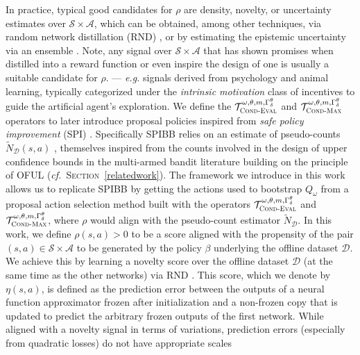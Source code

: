 In practice, typical good candidates for $\rho$ are density, novelty, or uncertainty estimates over
$\mathcal{S} \times \mathcal{A}$, which can be obtained, among other techniques,
via random network distillation (RND) \cite{Burda2018-vl},
or by estimating the epistemic uncertainty via an ensemble \cite{Osband2016-ff}.
Note, any signal over $\mathcal{S} \times \mathcal{A}$ that has shown promises when distilled into a reward function
or even inspire the design of one is usually a suitable candidate for $\rho$.
--- \textit{e.g.} signals derived from
psychology and animal learning,
typically categorized under the \textit{intrinsic motivation} \cite{Barto2013-jl, Niekum2010-yk, Schmidhuber2010-bg}
class of incentives to guide the artificial agent's exploration.
We define the
$\mathcal{T}_\textsc{Cond-Eval}^{\omega, \theta, m, \Gamma^\theta_\delta}$ and
$\mathcal{T}_\textsc{Cond-Max}^{\omega, \theta, m, \Gamma^\theta_\delta}$
operators to later introduce proposal policies inspired from \textit{safe policy improvement} (SPI)
\cite{Petrik2016-yc}.
Specifically SPIBB \cite{Laroche2019-ar} relies on an estimate of pseudo-counts
$\tilde{N}_\mathcal{D}(s,a)$ \cite{Bellemare2016-ab, Tang2016-ys, Ostrovski2017-ww},
themselves inspired from the counts involved in the design of upper confidence bounds
in the multi-armed bandit literature
building on the principle of OFUL (\textit{cf.}~\textsc{Section}~\ref{relatedwork}).
The framework we introduce in this work allows us to replicate SPIBB \cite{Laroche2019-ar}
by getting the actions used to bootstrap $Q_\omega$ from a proposal action selection method
built with the operators
$\mathcal{T}_\textsc{Cond-Eval}^{\omega, \theta, m, \Gamma^\theta_\delta}$ and
$\mathcal{T}_\textsc{Cond-Max}^{\omega, \theta, m, \Gamma^\theta_\delta}$,
where $\rho$ would align with the pseudo-count estimator $\tilde{N}_\mathcal{D}$.
In this work, we define $\rho(s,a) > 0$ to be a score aligned with the propensity of the pair
$(s,a) \in \mathcal{S \times \mathcal{A}}$ to be generated by the policy $\beta$ underlying the
offline dataset $\mathcal{D}$.
We achieve this by learning a novelty score over the offline dataset $\mathcal{D}$
(at the same time as the other networks)
via RND \cite{Burda2018-vl}.
This score, which we denote by $\eta(s,a)$, is defined as the prediction error between the outputs of
a neural function approximator frozen after initialization and a non-frozen copy that is updated to predict the
arbitrary frozen outputs of the first network.
While aligned with a novelty signal in terms of variations,
prediction errors (especially from quadratic losses) do not have appropriate scales
